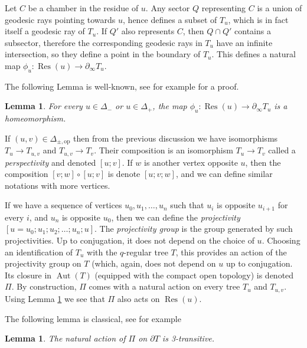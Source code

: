 \documentclass[a4paper, 11pt]{article}
\theoremstyle{plain}
\newtheorem{lemma}[proposition]{Lemma}
\theoremstyle{definition}
\theoremstyle{remark}
\DeclareMathOperator{\Aut}{Aut}
\DeclareMathOperator{\Res}{Res}
\newcommand{\pmop}{ {\pm,\mathrm{op}}}
\begin{document}
Let $C$ be a chamber in the residue of $u$. Any sector $Q$ representing $C$ is a union of geodesic rays pointing towards $u$, hence defines a subset of $T_u$, which is in fact itself a geodesic ray of $T_u$. If $Q'$ also represents $C$, then $Q\cap Q'$ contains a subsector, therefore the corresponding geodesic rays in $T_u$ have an infinite intersection, so they define a point in the boundary of $T_u$. This defines a natural map $\phi_u:\Res(u)\to \partial_\infty T_u$.

The following Lemma is well-known, see for example \cite[Lemma 4.2]{RemyTrojan} for a proof.

\begin{lemma}\label{lem:bdTu}
For every $u\in \Delta_-$ or $u\in \Delta_+$, the map $\phi_u:\Res(u)\to \partial_\infty T_u$ is a homeomorphism.
\end{lemma}

If $(u,v)\in \Delta_\pmop$ then from the previous discussion we have  isomorphisms $T_u\to T_{u,v}$ and $T_{u,v}\to T_v$. Their composition is an isomorphism $T_u\to T_v$ called a \emph{perspectivity} and denoted $[u;v]$. If $w$ is another vertex opposite $u$, then the composition $[v;w]\circ [u;v]$ is denote $[u;v;w]$, and we can define similar notations with more vertices.
 
  If we have a sequence of vertices $u_0,u_1,\dots,u_n$ such that $u_i$ is opposite $u_{i+1}$ for every $i$, and $u_n$ is opposite $u_0$, then we can define the \emph{projectivity} 
$[u=u_0;u_1;u_2;\dots; u_n;u]$. The \emph{projectivity group} is the group generated by such projectivities. Up to conjugation, it does not depend on the choice of $u$. Choosing an identification of $T_u$ with the $q$-regular tree $T$, this provides an action of the projectivity group on $T$ (which, again, does not depend on $u$ up to conjugation. Its closure in $\Aut(T)$ (equipped with the compact open topology) is denoted $\Pi$. By construction, $\Pi$ comes with a natural action on every tree $T_u$ and $T_{u,v}$. Using Lemma \ref{lem:bdTu} we see that $\Pi$ also acts on $\Res(u)$.


The following lemma is classical, see for example \cite[Proposition 2.4]{CameronBook}

\begin{lemma}\label{lem:3transitive}
The natural action of $\Pi$ on $\partial T$ is 3-transitive.
\end{lemma}
\end{document}
